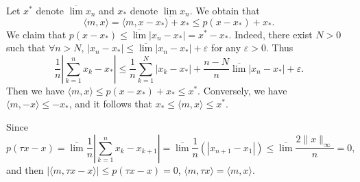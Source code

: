 \begin{enumerate}
\begin{answer}
\begin{enumerate}
        Let $x^*$ denote $\overline\lim x_n$ and $x_*$ denote $\underline \lim x_n$. We obtain that
        \[ \langle m, x\rangle  = \langle m, x-x_*\rangle + x_* \leq p(x-x_*) + x_*.\]
        We claim that $p(x-x_*)\leq \overline\lim |x_n - x_*| = x^*-x_*$. Indeed, there exist $N>0$ such that $\forall n > N$, $|x_n - x_*| \leq \overline\lim |x_n - x_*| + \varepsilon$ for any $\varepsilon>0$. Thus
        \[ \frac1n|\sum_{k=1}^n x_k - x_*|\leq \frac1n \sum_{k=1}^N |x_k - x_*| + \frac{n-N}{n}\overline\lim|x_n - x_*| + \varepsilon. \]
        Then we have $\langle m, x\rangle \leq p(x-x_*) + x_*\leq x^*$. Conversely, we have $\langle m, -x\rangle \leq -x_*$, and it follows that $x_*\leq \langle m, x\rangle \leq x^*$.

        Since
        \[ p(\tau x - x) = \overline\lim \frac1n |\sum_{k = 1}^nx_k - x_{k+1}| = \overline\lim\frac1n(|x_{n+1}-x_1|)\leq \overline\lim \frac{2\|x\|_\infty}{n} = 0, \]
        and then $|\langle m, \tau x - x\rangle|\leq p(\tau x - x) = 0$, $\langle m, \tau x\rangle = \langle m, x\rangle$.
      \end{enumerate}
    \end{answer}
\end{enumerate}


